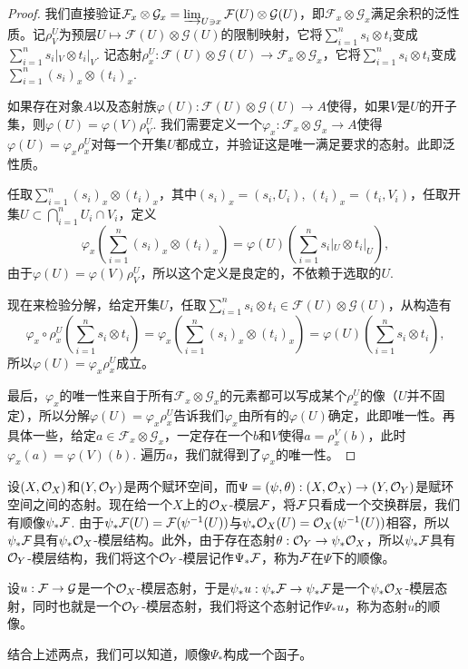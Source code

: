 \begin{proof}
我们直接验证$\mathcal{F}_x\otimes\mathcal{G}_x=\varinjlim_{U\ni x} \mathcal{F}(U)\otimes\mathcal{G}(U)$，即$\mathcal{F}_x\otimes\mathcal{G}_x$满足余积的泛性质。记$\rho^U_V$为预层$U\mapsto \mathcal{F}(U)\otimes \mathcal{G}(U)$的限制映射，它将$\sum_{i=1}^n s_i\otimes t_i$变成$\sum_{i=1}^n s_i|_V\otimes t_i|_V$. 记态射$\rho^U_x:\mathcal{F}(U)\otimes \mathcal{G}(U)\to \mathcal{F}_x\otimes\mathcal{G}_x$，它将$\sum_{i=1}^n s_i\otimes t_i$变成$\sum_{i=1}^n (s_i)_x\otimes (t_i)_x$.

如果存在对象$A$以及态射族$\varphi(U):\mathcal{F}(U)\otimes \mathcal{G}(U)\to A$使得，如果$V$是$U$的开子集，则$\varphi(U)=\varphi(V)\rho^U_V$. 我们需要定义一个$\varphi_x:\mathcal{F}_x\otimes\mathcal{G}_x\to A$使得$\varphi(U)=\varphi_x \rho^U_x$对每一个开集$U$都成立，并验证这是唯一满足要求的态射。此即泛性质。

任取$\sum_{i=1}^n (s_i)_x\otimes (t_i)_x$，其中$(s_i)_x=(s_i,U_i)$, $(t_i)_x=(t_i,V_i)$，任取开集$U\subset \bigcap_{i=1}^n U_i\cap V_i$，定义
\[
	\varphi_x\left(\sum_{i=1}^n (s_i)_x\otimes (t_i)_x\right)=\varphi(U)\left(\sum_{i=1}^n s_i|_U\otimes t_i|_U\right),
\]
由于$\varphi(U)=\varphi(V)\rho^U_V$，所以这个定义是良定的，不依赖于选取的$U$.

现在来检验分解，给定开集$U$，任取$\sum_{i=1}^n s_i\otimes t_i\in \mathcal{F}(U)\otimes \mathcal{G}(U)$，从构造有
\[
	\varphi_x\circ \rho^U_x\left(\sum_{i=1}^n s_i\otimes t_i\right)=\varphi_x\left(\sum_{i=1}^n (s_i)_x\otimes (t_i)_x\right)=\varphi(U)\left(\sum_{i=1}^n s_i\otimes t_i\right),
\]
所以$\varphi(U)=\varphi_x \rho^U_x$成立。

最后，$\varphi_x$的唯一性来自于所有$\mathcal{F}_x\otimes\mathcal{G}_x$的元素都可以写成某个$\rho_x^U$的像（$U$并不固定），所以分解$\varphi(U)=\varphi_x \rho^U_x$告诉我们$\varphi_x$由所有的$\varphi(U)$确定，此即唯一性。再具体一些，给定$a\in \mathcal{F}_x\otimes\mathcal{G}_x$，一定存在一个$b$和$V$使得$a=\rho^V_x(b)$，此时$\varphi_x(a)=\varphi(V)(b)$. 遍历$a$，我们就得到了$\varphi_x$的唯一性。
\end{proof}

\begin{para}[顺像]
设$(X,\mathcal{O}_X)$和$(Y,\mathcal{O}_Y)$是两个赋环空间，而$\Psi=(\psi,\theta):(X,\mathcal{O}_X)\to (Y,\mathcal{O}_Y)$是赋环空间之间的态射。现在给一个$X$上的$\mathcal{O}_X$-模层$\mathcal{F}$，将$\mathcal{F}$只看成一个交换群层，我们有顺像$\psi_*\mathcal{F}$. 由于$\psi_*\mathcal{F}(U)=\mathcal{F}(\psi^{-1}(U))$与$\psi_*\mathcal{O}_X(U)=\mathcal{O}_X(\psi^{-1}(U))$相容，所以$\psi_*\mathcal{F}$具有$\psi_*\mathcal{O}_X$-模层结构。此外，由于存在态射$\theta:\mathcal{O}_Y\to \psi_*\mathcal{O}_X$，所以$\psi_*\mathcal{F}$具有$\mathcal{O}_Y$-模层结构，我们将这个$\mathcal{O}_Y$-模层记作$\Psi_*\mathcal{F}$，称为$\mathcal{F}$在$\Psi$下的顺像。

设$u:\mathcal{F}\to\mathcal{G}$是一个$\mathcal{O}_X$-模层态射，于是$\psi_*u:\psi_*\mathcal{F}\to\psi_*\mathcal{F}$是一个$\psi_*\mathcal{O}_X$-模层态射，同时也就是一个$\mathcal{O}_Y$-模层态射，我们将这个态射记作$\Psi_*u$，称为态射$u$的顺像。

结合上述两点，我们可以知道，顺像$\Psi_*$构成一个函子。
\end{para}

